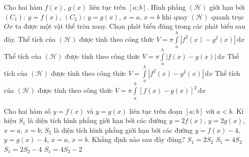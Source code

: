 \begin{ex}%
	Cho hai hàm $f(x)$, $g(x)$ liên tục trên $[a;b]$. Hình phẳng $(\mathcal{H})$ giới hạn bởi $(C_1):\ y=f(x)$, $(C_2):\ y=g(x)$, $x=a$, $x=b$ khi quay $(\mathcal{H})$ quanh trục $Ox$ ta được một vật thể tròn xoay. Chọn phát biểu đúng trong các phát biểu sau đây.
	\choice
	{\True  Thể tích của $(\mathcal{H})$ được tính theo công thức $V=\pi\displaystyle\int\limits_a^b\left|f^2(x)-g^2(x)\right|\mathrm{\,d}x$}
	{Thể tích của $(\mathcal{H})$ được tính theo công thức $V=\pi\displaystyle\int\limits_a^b\left|f(x)-g(x)\right|\mathrm{\,d}x$}
	{Thể tích của $(\mathcal{H})$ được tính theo công thức $V=\displaystyle\int\limits_a^b\left|f^2(x)-g^2(x)\right|\mathrm{\,d}x$}
	{Thể tích của $(\mathcal{H})$ được tính theo công thức $V=\pi\displaystyle\int\limits_a^b\left[f(x)-g(x)\right]^2\mathrm{\,d}x$}
\end{ex}

\begin{ex}%
	Cho hai hàm số $y=f(x)$ và $y=g(x)$ liên tục trên đoạn $[a;b]$ với $a<b$. Kí hiệu $S_1$ là diện tích hình phẳng giới hạn bởi các đường $y=2f(x)$, $y=2g(x)$, $x=a$, $x=b$; $S_2$ là diện tích hình phẳng giới hạn bởi các đường $y=f(x)-4$, $y=g(x)-4$, $x=a$, $x=b$. Khẳng định nào sau đây đúng?
	\choice
	{\True $S_1=2S_2$}
	{$S_1=4S_2$}
	{$S_1=2S_2-4$}
	{$S_1=4S_2-2$}
\end{ex}

